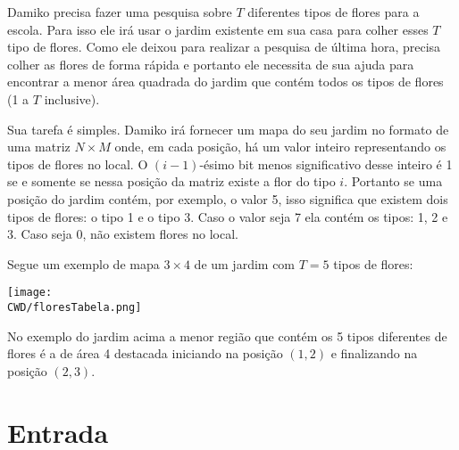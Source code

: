 

%


Damiko precisa fazer uma pesquisa sobre $T$ diferentes tipos de flores para a escola.
 Para isso ele irá usar o jardim existente em sua casa para colher esses $T$ tipo de flores.
 Como ele deixou para realizar a pesquisa de última hora, precisa colher as flores de forma rápida e portanto ele necessita de sua ajuda para encontrar a menor área quadrada do jardim que contém todos os tipos de flores (1 a $T$ inclusive).



Sua tarefa é simples.
Damiko irá fornecer um mapa do seu jardim no formato de uma matriz $N \times M$ onde, em cada posição, há um valor inteiro representando os tipos de flores no local.
O $(i-1)$-ésimo bit menos significativo desse inteiro é 1 se e somente se nessa posição da matriz existe a flor do tipo $i$. 
 Portanto se uma posição do jardim contém, por exemplo, o valor 5, isso significa que existem dois tipos de flores: o tipo 1 e o tipo 3.
 Caso o valor seja 7 ela contém os tipos:  1, 2 e 3.
 Caso seja 0, não existem flores no local.

Segue um exemplo de mapa $3 \times 4$ de um jardim com $T=5$ tipos de flores:

\begin{center}
  \texttt{[image: \\CWD/floresTabela.png]}
\end{center}

No exemplo do jardim acima a menor região que contém os 5 tipos diferentes de flores é a de área 4 destacada iniciando na posição $(1, 2)$ e finalizando na posição $(2, 3)$.


\section*{Entrada}

